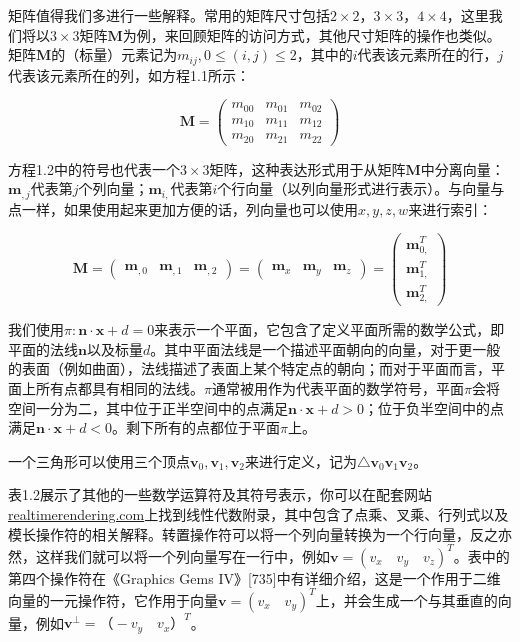 \documentclass[
  paper=a4,
  ,captions=tableheading
]{scrartcl}
\begin{document}
矩阵值得我们多进行一些解释。常用的矩阵尺寸包括\(2 \times 2\)，\(3 \times 3\)，\(4 \times 4\)，这里我们将以\(3 \times 3\)矩阵\(\mathbf{M}\)为例，来回顾矩阵的访问方式，其他尺寸矩阵的操作也类似。矩阵\(\mathbf{M}\)的（标量）元素记为\(m_{ij}, 0 \le (i, j) \le 2\)，其中的\(i\)代表该元素所在的行，\(j\)代表该元素所在的列，如方程1.1所示：

\[
\mathbf{M} = 
\left( \begin{array}{ccc} 
m_{00} & m_{01} & m_{02} \\ 
m_{10} & m_{11} & m_{12} \\
m_{20} & m_{21} & m_{22}  
\end{array} \right) \tag{1.1}
\]

方程1.2中的符号也代表一个\(3 \times 3\)矩阵，这种表达形式用于从矩阵\(\mathbf{M}\)中分离向量：\(\mathbf{m}_{,j}\)代表第\(j\)个列向量；\(\mathbf{m}_{i,}\)代表第\(i\)个行向量（以列向量形式进行表示）。与向量与点一样，如果使用起来更加方便的话，列向量也可以使用\(x, y, z, w\)来进行索引：

\[
\mathbf{M}=\left(\begin{array}{lll}\mathbf{m}_{, 0} & \mathbf{m}_{, 1} & \mathbf{m}_{, 2}\end{array}\right)=\left(\begin{array}{lll}\mathbf{m}_{x} & \mathbf{m}_{y} & \mathbf{m}_{z}\end{array}\right)=\left(\begin{array}{c}\mathbf{m}_{0,}^{T} \\[2mm] \mathbf{m}_{1,}^{T} \\[2mm] \mathbf{m}_{2,}^{T}\end{array}\right)
\tag{1.2} 
\]

我们使用\(\pi :\mathbf{n} \cdot \mathbf{x} + d = 0\)来表示一个平面，它包含了定义平面所需的数学公式，即平面的法线\(\mathbf{n}\)以及标量\(d\)。其中平面法线是一个描述平面朝向的向量，对于更一般的表面（例如曲面），法线描述了表面上某个特定点的朝向；而对于平面而言，平面上所有点都具有相同的法线。\(\pi\)通常被用作为代表平面的数学符号，平面\(\pi\)会将空间一分为二，其中位于正半空间中的点满足\(\mathbf{n} \cdot \mathbf{x} + d > 0\)；位于负半空间中的点满足\(\mathbf{n} \cdot \mathbf{x} + d < 0\)。剩下所有的点都位于平面\(\pi\)上。

一个三角形可以使用三个顶点\(\mathbf{v}_0, \mathbf{v}_1, \mathbf{v}_2\)来进行定义，记为\(\triangle \mathbf{v}_0 \mathbf{v}_1 \mathbf{v}_2\)。

表1.2展示了其他的一些数学运算符及其符号表示，你可以在配套网站\href{http://realtimerendering.com/}{realtimerendering.com}上找到线性代数附录，其中包含了点乘、叉乘、行列式以及模长操作符的相关解释。转置操作符可以将一个列向量转换为一个行向量，反之亦然，这样我们就可以将一个列向量写在一行中，例如\(\mathbf{v} = (v_x \quad v_y \quad v_z)^T\)。表中的第四个操作符在《Graphics Gems IV》{[}735{]}中有详细介绍，这是一个作用于二维向量的一元操作符，它作用于向量\(\mathbf{v} = (v_x \quad v_y)^T\)上，并会生成一个与其垂直的向量，例如\(\mathbf{v}^\perp = （-v_y \quad v_x）^T\)。
\end{document}
